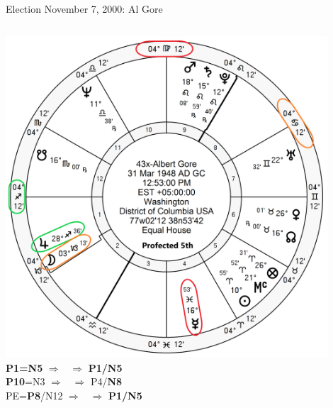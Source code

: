 \begin{frame}[t]{Election November 7, 2000: Al Gore}
\begin{columns}[T, onlytextwidth]
\vspace{-1em}
{\includegraphics[width=0.9\textwidth]{charts/Gore-Prof-5th.png}}
\fontsize{8pt}{9pt}\selectfont
\textbf{\dgreen P1=N5}
	$\Rightarrow$ \Jupiter\, $\Rightarrow$ \textbf{\dgreen P1/N5}\\
\textbf{\red P10}=N3
	$\Rightarrow$ \Mercury\, $\Rightarrow$ P4/\textbf{\red N8}\\
PE=\textbf{\red P8}/N12
	 $\Rightarrow$ \Moon\, $\Rightarrow$ \textbf{\dgreen P1/N5}

\end{columns}
\end{frame}
